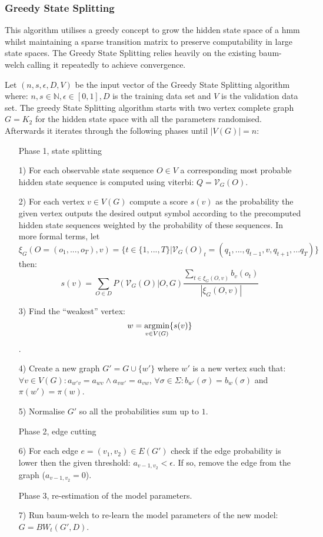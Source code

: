 \subsubsection{Greedy State Splitting}

This algorithm utilises a greedy concept to grow the hidden state space of a \gls{hmm} whilst maintaining a sparse transition matrix to preserve computability in large state spaces. The Greedy State Splitting relies heavily on the existing \gls{baum-welch} calling it repeatedly to achieve convergence.

Let $(n, s, \epsilon, D, V)$ be the input vector of the Greedy State Splitting algorithm where: $n, s \in \mathbb{N}, \epsilon\in[0,1], D$ is the training data set and $V$ is the validation data set. The greedy State Splitting algorithm starts with two vertex complete graph $G=K_2$ for the hidden state space with all the parameters randomised. Afterwards it iterates through the following phases until $|V(G)| = n$:

\begin{itemize}
	\item[] Phase 1, state splitting
	\item[1)] For each observable state sequence $O \in V$ a corresponding most probable hidden state sequence is computed using \gls{viterbi}: $Q=\mathcal{V}_G(O)$.
	\item[2)] For each vertex $v \in V(G)$ compute a score $s(v)$ as the probability the given vertex outputs the desired output symbol according to the precomputed hidden state sequences weighted by the probability of these sequences. In more formal terms, let $\xi_G(O=(o_1,...,o_T), v) = \{t\in\{1, ..., T\}|\mathcal{V}_G(O)_t=(q_1,...,q_{t-1},v, q_{t+1}, ... q_T)\}$ then: $$s(v) = \sum_{O\in D}P(\mathcal{V}_G(O)|O,G) \frac{\sum_{t \in \xi_G(O, v)}b_v(o_t)}{|\xi_G(O, v)|}$$
	\item[3)] Find the ``weakest'' vertex: $$w = \operatorname*{\arg\!\min}_{v\in V(G)}\{s(v)\}$$.
	\item[4)] Create a new graph $G' = G\cup \{w'\}$ where $w'$ is a new vertex such that: $\forall v\in V(G): a_{w'v} = a_{wv} \land a_{vw'} = a_{vw}$, $\forall \sigma \in \Sigma: b_{w'}(\sigma) = b_w(\sigma)$ and $\pi(w') = \pi(w)$.
	\item[5)] Normalise $G'$ so all the probabilities sum up to $1$.
	\item[] Phase 2, edge cutting
	\item[6)] For each edge $e = (v_1,v_2)\in E(G')$ check if the edge probability is lower then the given threshold: $a_{v-1,v_2}<\epsilon$. If so, remove the edge from the graph ($a_{v-1,v_2} = 0$).
	\item[] Phase 3, re-estimation of the model parameters.
	\item[7)] Run \gls{baum-welch} to re-learn the model parameters of the new model: $G = BW_t(G', D)$.
\end{itemize}

